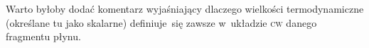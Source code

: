 \documentclass[a4paper,11pt]{article}
\begin{document}
\noindent
{}

\vspace{\spaceFour}




\noindent
{} Warto byłoby dodać komentarz wyjaśniający dlaczego wielkości
termodynamiczne (określane tu jako skalarne) definiuje~się zawsze
w~układzie \textsc{cw} danego fragmentu płynu.

\vspace{\spaceFour}





\noindent
{}





\newpage

\end{document}
